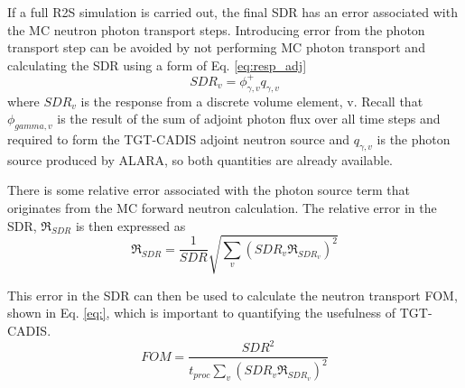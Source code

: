 If a full R2S simulation is carried out, the final SDR has an error associated
with the MC neutron photon transport steps.  Introducing error from the photon transport
step can be avoided by not performing MC photon transport and calculating the
SDR using a form of Eq. \ref{eq:resp_adj}
\begin{equation}\label{eq:resp_v}
	SDR_v = \phi_{\gamma, v}^{+} q_{\gamma, v}
\end{equation}
where $SDR_v$ is the response from a discrete volume element, v.
Recall that $\phi_{gamma, v}$ is the result of the sum of adjoint photon flux 
over all time steps and required to form the TGT-CADIS adjoint neutron source
and $q_{\gamma, v}$ is the photon source produced by ALARA, so both quantities
are already available.

There is some relative error associated with the photon source term that
originates from the MC forward neutron calculation.  
The relative error in the
SDR, $\Re_{SDR}$ is then expressed as 
\begin{equation}\label{eq:err}
	\Re_{SDR} = \frac{1}{SDR} \sqrt{\sum_v{(SDR_v \Re_{SDR_v})^2}}
\end{equation}

This error in the SDR can then be used to calculate the neutron transport
FOM, shown in Eq. \ref{eq:}, which is important to quantifying the usefulness of TGT-CADIS.
\begin{equation}\label{eq:fom}
	FOM = \frac{SDR^2}{t_{proc}\sum_v{(SDR_v \Re_{SDR_v})^2}}
\end{equation}






